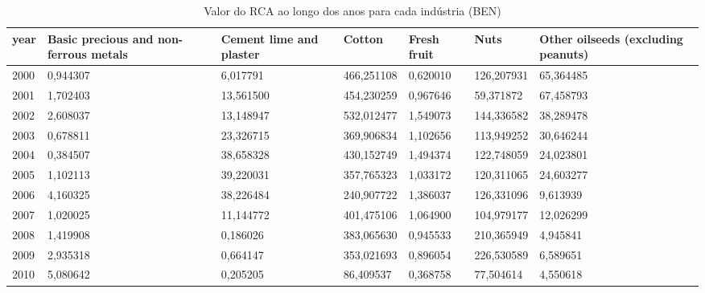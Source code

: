 \begin{table}
\centering
\caption{Valor do RCA ao longo dos anos para cada indústria (BEN)}
\begin{tabular}{p{1cm}p{2cm}p{2cm}p{2cm}p{2cm}p{2cm}p{2cm}}
\toprule
 year &  Basic precious and non-ferrous metals &  Cement lime and plaster &     Cotton &  Fresh fruit &       Nuts &  Other oilseeds (excluding peanuts) \\
\midrule
 2000 &                               0,944307 &                 6,017791 & 466,251108 &     0,620010 & 126,207931 &                           65,364485 \\
 2001 &                               1,702403 &                13,561500 & 454,230259 &     0,967646 &  59,371872 &                           67,458793 \\
 2002 &                               2,608037 &                13,148947 & 532,012477 &     1,549073 & 144,336582 &                           38,289478 \\
 2003 &                               0,678811 &                23,326715 & 369,906834 &     1,102656 & 113,949252 &                           30,646244 \\
 2004 &                               0,384507 &                38,658328 & 430,152749 &     1,494374 & 122,748059 &                           24,023801 \\
 2005 &                               1,102113 &                39,220031 & 357,765323 &     1,033172 & 120,311065 &                           24,603277 \\
 2006 &                               4,160325 &                38,226484 & 240,907722 &     1,386037 & 126,331096 &                            9,613939 \\
 2007 &                               1,020025 &                11,144772 & 401,475106 &     1,064900 & 104,979177 &                           12,026299 \\
 2008 &                               1,419908 &                 0,186026 & 383,065630 &     0,945533 & 210,365949 &                            4,945841 \\
 2009 &                               2,935318 &                 0,664147 & 353,021693 &     0,896054 & 226,530589 &                            6,589651 \\
 2010 &                               5,080642 &                 0,205205 &  86,409537 &     0,368758 &  77,504614 &                            4,550618 \\

\end{tabular}
\end{table}
